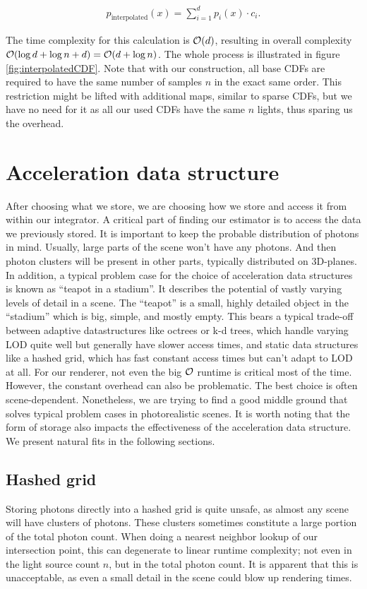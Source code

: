 \begin{align}\label{eq:pinter}
    p_{\text{interpolated}}(x) = \sum_{i=1}^{d}p_{i}(x) \cdot c_i.
\end{align}

The time complexity for this calculation is $\mathcal{O}(d)$, resulting in overall complexity $\mathcal{O}(\log{d} + \log{n} + d) = \mathcal{O}(d + \log{n})$. The whole process is illustrated in figure \ref{fig:interpolatedCDF}. Note that with our construction, all base CDFs are required to have the same number of samples $n$ in the exact same order. This restriction might be lifted with additional maps, similar to sparse CDFs, but we have no need for it as all our used CDFs have the same $n$ lights, thus sparing us the overhead.

\section{Acceleration data structure}
\label{ch:AccelDat}

After choosing what we store, we are choosing how we store and access it from within our integrator. A critical part of finding our estimator is to access the data we previously stored. It is important to keep the probable distribution of photons in mind. Usually, large parts of the scene won't have any photons. And then photon clusters will be present in other parts, typically distributed on 3D-planes. In addition, a typical problem case for the choice of acceleration data structures is known as \enquote{teapot in a stadium}. It describes the potential of vastly varying levels of detail in a scene. The \enquote{teapot} is a small, highly detailed object in the \enquote{stadium} which is big, simple, and mostly empty. This bears a typical trade-off between adaptive datastructures like octrees or k-d trees, which handle varying LOD quite well but generally have slower access times, and static data structures like a hashed grid, which has fast constant access times but can't adapt to LOD at all. For our renderer, not even the big $\mathcal{O}$ runtime is critical most of the time. However, the constant overhead can also be problematic. The best choice is often scene-dependent. Nonetheless, we are trying to find a good middle ground that solves typical problem cases in photorealistic scenes. It is worth noting that the form of storage also impacts the effectiveness of the acceleration data structure. We present natural fits in the following sections.

\subsection{Hashed grid}
\label{ch:pnee:hashedgrid}
Storing photons directly into a hashed grid is quite unsafe, as almost any scene will have clusters of photons. These clusters sometimes constitute a large portion of the total photon count. When doing a nearest neighbor lookup of our intersection point, this can degenerate to linear runtime complexity; not even in the light source count $n$, but in the total photon count. It is apparent that this is unacceptable, as even a small detail in the scene could blow up rendering times.

